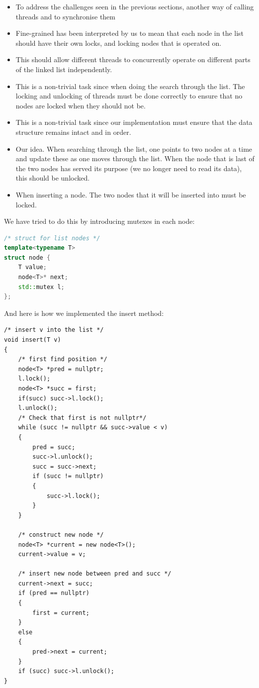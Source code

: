 \begin{itemize}
	\item To address the challenges seen in the previous sections, another way 
	of calling threads and to synchronise them
	\item Fine-grained has been interpreted by us to mean that each node in the 
	list should have their own locks, and locking nodes that is operated on.
	\item This should allow different threads to concurrently operate on different
	parts of the linked list independently.
	\item This is a non-trivial task since when doing the search through the list.
	The locking and unlocking of threads must be done correctly to ensure that no
	nodes are locked when they should not be.
	\item This is a non-trivial task since our implementation must ensure that
	the data structure remains intact and in order. 
	\item Our idea. When searching through the list, one points to two nodes at 
	a time and update these as one moves through the list. When the node that 
	is last of the two nodes has served its purpose (we no longer need to read
	its data), this should be unlocked. 
	\item When inserting a node. The two nodes that it will be inserted into 
	must be locked.
\end{itemize}

We have tried to do this by introducing mutexes in each node:

\begin{lstlisting}[language=C++, caption=Node with lock]
/* struct for list nodes */
template<typename T>
struct node {
	T value;
	node<T>* next;
	std::mutex l;
};
\end{lstlisting}

And here is how we implemented the insert method:

\begin{lstlisting}
/* insert v into the list */
void insert(T v)
{
	/* first find position */
	node<T> *pred = nullptr;
	l.lock();
	node<T> *succ = first;
	if(succ) succ->l.lock();
	l.unlock();
	/* Check that first is not nullptr*/
	while (succ != nullptr && succ->value < v)
	{
		pred = succ;
		succ->l.unlock();
		succ = succ->next;
		if (succ != nullptr)
		{
			succ->l.lock();
		}
	}

	/* construct new node */
	node<T> *current = new node<T>();
	current->value = v;

	/* insert new node between pred and succ */
	current->next = succ;
	if (pred == nullptr)
	{
		first = current;
	}
	else
	{
		pred->next = current;
	}
	if (succ) succ->l.unlock();
}
\end{lstlisting}

